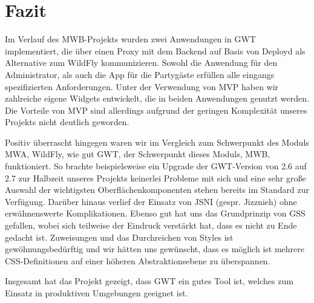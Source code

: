 \section{Fazit}
Im Verlauf des MWB-Projekts wurden zwei Anwendungen in GWT implementiert, die über einen Proxy mit dem Backend auf Basis von Deployd als Alternative zum WildFly kommunizieren. Sowohl die Anwendung für den Administrator, als auch die App für die Partygäste erfüllen alle eingangs spezifizierten Anforderungen. Unter der Verwendung von MVP haben wir zahlreiche eigene Widgets entwickelt, die in beiden Anwendungen genutzt werden. Die Vorteile von MVP sind allerdings aufgrund der geringen Komplexität unseres Projekts nicht deutlich geworden. 

Positiv überrascht hingegen waren wir im Vergleich zum Schwerpunkt des Moduls MWA, WildFly, wie gut GWT, der Schwerpunkt dieses Moduls, MWB, funktioniert. So brachte beispielsweise ein Upgrade der GWT-Version von 2.6 auf 2.7 zur Halbzeit unseres Projekts keinerlei Probleme mit sich und eine sehr große Auswahl der wichtigsten Oberflächenkomponenten stehen bereits im Standard zur Verfügung. Darüber hinaus verlief der Einsatz von JSNI (gespr. Jizznieh) ohne erwähnenswerte Komplikationen. Ebenso gut hat uns das Grundprinzip von GSS gefallen, wobei sich teilweise der Eindruck verstärkt hat, dass es nicht zu Ende gedacht ist. Zuweisungen und das Durchreichen von Styles ist gewöhnungsbedürftig und wir hätten uns gewünscht, dass es möglich ist mehrere CSS-Definitionen auf einer höheren Abstraktionsebene zu überspannen.

Insgesamt hat das Projekt gezeigt, dass GWT ein gutes Tool ist, welches zum Einsatz in produktiven Umgebungen geeignet ist.
